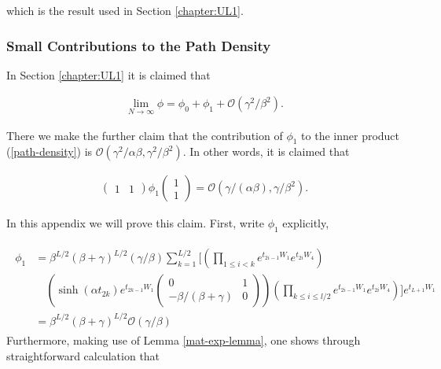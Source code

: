 which is the result used in Section \ref{chapter:UL1}.

\subsubsection{Small Contributions to the Path Density}
In Section \ref{chapter:UL1} it is claimed that 

\begin{align}
\lim_{N\rightarrow \infty} \phi = \phi_0 + \phi_1 + \mathcal{O}(\gamma^2/\beta^2). 
\end{align}

There we make the further claim that the contribution of $\phi_1$ to the inner product (\ref{path-density}) is $\mathcal{O}(\gamma^2/\alpha\beta, \gamma^2/\beta^2)$. In other words, it is claimed that 

\begin{align}
\begin{pmatrix}1 & 1 \end{pmatrix}\phi_1 \begin{pmatrix}1 \\ 1 \end{pmatrix} = \mathcal{O}(\gamma/(\alpha\beta), \gamma/\beta^2).
\end{align}

In this appendix we will prove this claim. First, write $\phi_1$ explicitly,

\small  
\begin{align}
\begin{split}
\phi_1 &= \beta^{L/2}(\beta+\gamma)^{L/2}(\gamma/\beta) \sum_{k=1}^{L/2}\bigg [ \left(\prod_{1 \leq i < k}e^{t_{2i-1}W_1}e^{t_{2i}W_4}\right)\\ &\quad \left(\sinh(\alpha t_{2k})e^{t_{2k-1}W_1}\begin{pmatrix}0 & 1 \\ -\beta/(\beta + \gamma) & 0\end{pmatrix}\right)\left(\prod_{k \leq i \leq l/2}e^{t_{2i-1}W_1}e^{t_{2i}W_4}\right) \bigg]e^{t_{L+1}W_1} \\ 
&= \beta^{L/2}(\beta+\gamma)^{L/2} \mathcal{O}(\gamma/\beta)
\end{split}
\end{align}
\normalsize
Furthermore, making use of Lemma \ref{mat-exp-lemma}, one shows through straightforward calculation that 


